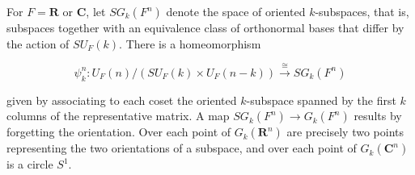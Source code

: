 For $F = \mathbf{R}$ or $\mathbf{C}$, let $SG_k(F^n)$ denote the space of oriented $k$-subspaces, that is, subspaces together with an equivalence class of orthonormal bases that differ by the action of $SU_F(k)$. There is a homeomorphism

$$\psi_k^n: U_F(n)/(SU_F(k) \times U_F(n-k)) \xrightarrow{\cong} SG_k(F^n)$$

given by associating to each coset the oriented $k$-subspace spanned by the first $k$ columns of the representative matrix. A map $SG_k(F^n) \rightarrow G_k(F^n)$ results by forgetting the orientation. Over each point of $G_k(\mathbf{R}^n)$ are precisely two points representing the two orientations of a subspace, and over each point of $G_k(\mathbf{C}^n)$ is a circle $S^1$.
